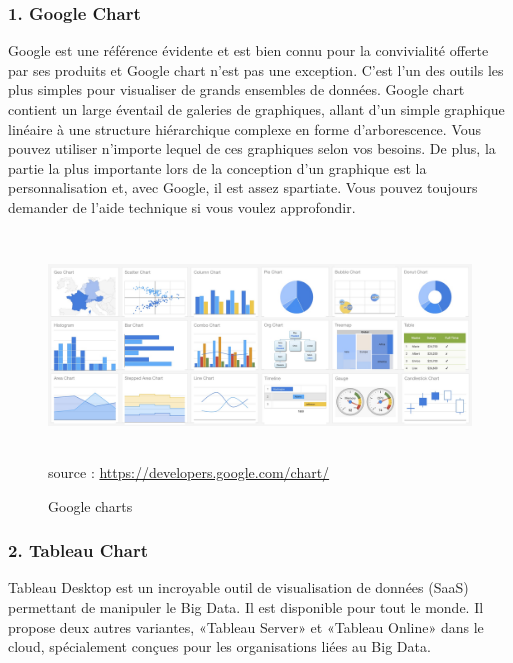 \documentclass[french, a4paper, 12pt]{report}
\begin{document}
\subsubsection{1. Google Chart}
Google est une référence évidente et est bien connu pour la convivialité offerte par ses produits et Google chart n’est pas une exception. C'est l'un des outils les plus simples pour visualiser de grands ensembles de données. Google chart contient un large éventail de galeries de graphiques, allant d'un simple graphique linéaire à une structure hiérarchique complexe en forme d'arborescence. Vous pouvez utiliser n'importe lequel de ces graphiques selon vos besoins. De plus, la partie la plus importante lors de la conception d’un graphique est la personnalisation et, avec Google, il est assez spartiate. Vous pouvez toujours demander de l’aide technique si vous voulez approfondir.
\begin{figure}[!htp]
    \centering
    \includegraphics[height=6cm]{images/googlecharts.jpg}
    \scriptsize{source : \url{https://developers.google.com/chart/}}
    \caption{Google charts}
    \label{fig:2.16}
\end{figure}
\subsubsection{2. Tableau Chart}
Tableau Desktop est un incroyable outil de visualisation de données (SaaS) permettant de manipuler le Big Data. Il est disponible pour tout le monde. Il propose deux autres variantes, «Tableau Server» et «Tableau Online» dans le cloud, spécialement conçues pour les organisations liées au Big Data.
\end{document}
